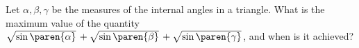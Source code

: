 Let $\alpha, \beta, \gamma$ be the measures of the internal angles in a triangle.
What is the maximum value of the quantity
$\sqrt{\sin\paren{\alpha}} \,
 + \sqrt{\sin\paren{\beta}} \,
 + \sqrt{\sin\paren{\gamma}} \mspace{1.5mu}$,
and when is it achieved?
